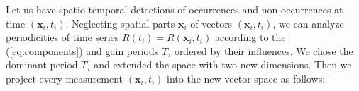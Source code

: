 %

Let us have spatio-temporal detections of occurrences and non-occurrences at time $\left(\mathbf{x}_i, t_i\right)$.
Neglecting spatial parts $\mathbf{x}_{i}$ of vectors $\left(\mathbf{x}_i, t_i\right)$, we can analyze periodicities of time series $R\left(t_{i}\right) = R\left(\mathbf{x}_i, t_i\right)$ according to the (\ref{eq:components}) and gain periods $T_{\tau}$ ordered by their influences.
We chose the dominant period $T_{\tau}$ and extended the space with two new dimensions.
Then we project every measurement $\left(\mathbf{x}_i, t_i\right)$ into the new vector space as follows:


